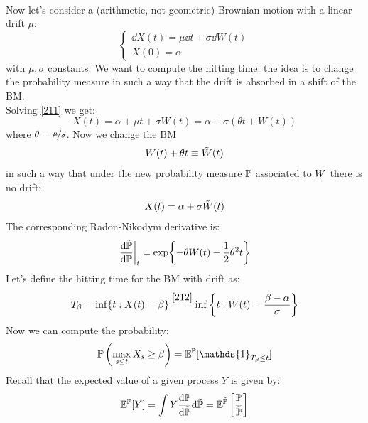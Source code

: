 \\ Now let's consider a (arithmetic, not geometric) Brownian motion with a linear drift $\mu$:
\begin{equation}\label{211}
    \begin{cases}
    \dd X(t) = \mu\dd t + \sigma\dd W(t) \\
    X(0) = \alpha
    \end{cases}
\end{equation}
with $\mu,\sigma$ constants. We want to compute the hitting time: the idea is to change the probability measure in such a way that the drift is absorbed in a shift of the BM. \\
Solving \eqref{211} we get:
\begin{equation}
    X(t) = \alpha + \mu t + \sigma W(t) = \alpha + \sigma\left(\theta t + W(t)\right)
\end{equation}
where $\theta = \nicefrac{\mu}{\sigma}$. Now we change the BM
\begin{equation}\label{ww}
    W(t)+\theta t \equiv \Tilde{W}(t)
\end{equation}
in such a way that under the new probability measure $\Tilde{\mathbb{P}}$ associated to $\Tilde{W}$ there is no drift:
\begin{equation}\label{212}
    X(t) = \alpha + \sigma\Tilde{W}(t)
\end{equation}
The corresponding Radon-Nikodym derivative is:
\begin{equation} %
    \eval{\frac{\dd\Tilde{\Pmeas}}{\dd\Pmeas}}_t = \exp{-\theta W(t) - \frac{1}{2}\theta^2 t}
\end{equation}
Let's define the hitting time for the BM with drift as:
\begin{equation}
    T_{\beta} = \inf\{t:X(t)=\beta\} \overset{\eqref{212}}{=} \inf\bigg\{t: \Tilde{W}(t) = \frac{\beta-\alpha}{\sigma}\bigg\}
\end{equation}
Now we can compute the probability:
\begin{align}\label{213}
    \Pmeas\left(\max_{s\le t}X_s \ge \beta\right) = \mathbb{E}^{\Pmeas}[\mathds{1}_{T_{\beta}\le t}]
\end{align}
Recall that the expected value of a given process $Y$ is given by:
\begin{equation*}
    \mathbb{E}^{\mathbb{P}}[Y] = \int Y \dfrac{\dd\mathbb{P}}{\dd\Tilde{\mathbb{P}}}\dd\Tilde{\mathbb{P}} = \mathbb{E}^{\Tilde{\mathbb{P}}}\left[\frac{\mathbb{P}}{\Tilde{\mathbb{P}}}\right]
\end{equation*}
